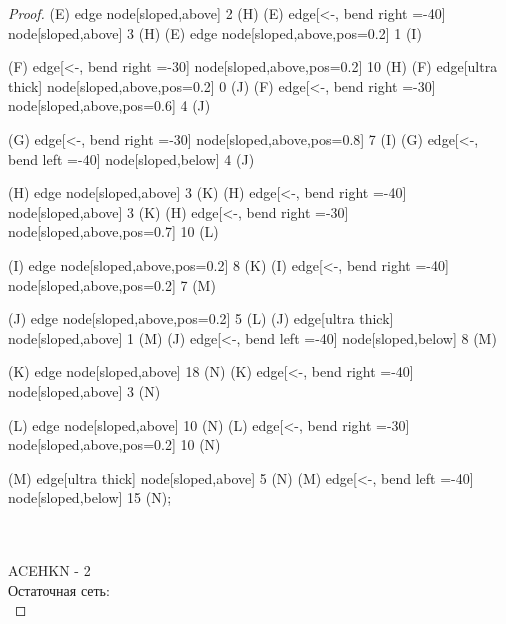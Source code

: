 \begin{proof}
{    (E) edge node[sloped,above] {2} (H)
    (E) edge[<-, bend right =-40] node[sloped,above] {3} (H)
    (E) edge node[sloped,above,pos=0.2] {1} (I)
    
    (F) edge[<-, bend right =-30] node[sloped,above,pos=0.2] {10} (H)
    (F) edge[ultra thick] node[sloped,above,pos=0.2] {0} (J)
    (F) edge[<-, bend right =-30] node[sloped,above,pos=0.6] {4} (J)
    
    (G) edge[<-, bend right =-30] node[sloped,above,pos=0.8] {7} (I)
    (G) edge[<-, bend left =-40] node[sloped,below] {4} (J)
    
    (H) edge node[sloped,above] {3} (K)
    (H) edge[<-, bend right =-40] node[sloped,above] {3} (K)
    (H) edge[<-, bend right =-30] node[sloped,above,pos=0.7] {10} (L)
    
    (I) edge node[sloped,above,pos=0.2] {8} (K)
    (I) edge[<-, bend right =-40] node[sloped,above,pos=0.2] {7} (M)
    
    (J) edge node[sloped,above,pos=0.2] {5} (L)
    (J) edge[ultra thick] node[sloped,above] {1} (M)
    (J) edge[<-, bend left =-40] node[sloped,below] {8} (M)
    
    (K) edge node[sloped,above] {18} (N)
    (K) edge[<-, bend right =-40] node[sloped,above] {3} (N)
    
    (L) edge node[sloped,above] {10} (N)
    (L) edge[<-, bend right =-30] node[sloped,above,pos=0.2] {10} (N)
    
    (M) edge[ultra thick] node[sloped,above] {5} (N)
    (M) edge[<-, bend left =-40] node[sloped,below] {15} (N);
    }\\\\
ACEHKN - 2\\
    Остаточная сеть:\\
        \usetikzlibrary{graphs,automata,positioning}
\end{proof}
